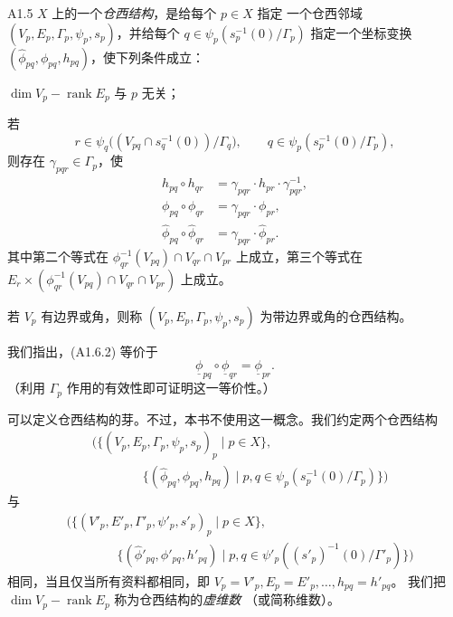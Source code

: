 \begin{definition}{A1.5}\label{def:a1-5}
$X$ 上的一个\emph{仓西结构}，是给每个 $p\in X$ 指定
一个仓西邻域 $(V_p,E_p,\Gamma_p,\psi_p,s_p)$，并给每个
$q\in\psi_p(s_p^{-1}(0)/\Gamma_p)$ 指定一个坐标变换
$(\widehat\phi_{pq},\phi_{pq},h_{pq})$，使下列条件成立：
\begin{description}[style=multiline,leftmargin=7.2em,labelwidth=6.5em]
\item[\textup{(A1.6.1)}] $\dim V_p-\operatorname{rank}E_p$ 与 $p$ 无关；
\item[\textup{(A1.6.2)}] 若
\[
 r\in\psi_q\bigl((V_{pq}\cap s_q^{-1}(0))/\Gamma_q\bigr),
 \qquad q\in\psi_p(s_p^{-1}(0)/\Gamma_p),
\]
则存在 $\gamma_{pqr}\in\Gamma_p$，使
\[
\begin{aligned}
 h_{pq}\circ h_{qr}
 &=\gamma_{pqr}\cdot h_{pr}\cdot\gamma_{pqr}^{-1},\\
 \phi_{pq}\circ\phi_{qr}
 &=\gamma_{pqr}\cdot\phi_{pr},\\
 \widehat\phi_{pq}\circ\widehat\phi_{qr}
 &=\gamma_{pqr}\cdot\widehat\phi_{pr}.
\end{aligned}
\]
其中第二个等式在
$\phi_{qr}^{-1}(V_{pq})\cap V_{qr}\cap V_{pr}$ 上成立，第三个等式在
$E_r\times(\phi_{qr}^{-1}(V_{pq})\cap V_{qr}\cap V_{pr})$ 上成立。
\end{description}
若 $V_p$ 有边界或角，则称
$(V_p,E_p,\Gamma_p,\psi_p,s_p)$ 为带边界或角的仓西结构。
\end{definition}

我们指出，(A1.6.2) 等价于
\[
 \underline\phi_{pq}\circ\underline\phi_{qr}
 =\underline\phi_{pr}.
\]
（利用 $\Gamma_p$ 作用的有效性即可证明这一等价性。）

可以定义仓西结构的芽。不过，本书不使用这一概念。我们约定两个仓西结构
\[
\begin{split}
 &\bigl(\{(V_p,E_p,\Gamma_p,\psi_p,s_p)_p\mid p\in X\},\\
 &\hspace{4em}\{(\widehat\phi_{pq},\phi_{pq},h_{pq})
   \mid p,q\in\psi_p(s_p^{-1}(0)/\Gamma_p)\}\bigr)
\end{split}
\]
与
\[
\begin{split}
 &\bigl(\{(V'_p,E'_p,\Gamma'_p,\psi'_p,s'_p)_p\mid p\in X\},\\
 &\hspace{4em}\{(\widehat\phi'_{pq},\phi'_{pq},h'_{pq})
   \mid p,q\in\psi'_p((s'_p)^{-1}(0)/\Gamma'_p)\}\bigr)
\end{split}
\]
相同，当且仅当所有资料都相同，即
$V_p=V'_p,E_p=E'_p,\ldots,h_{pq}=h'_{pq}$。
我们把 $\dim V_p-\operatorname{rank}E_p$ 称为仓西结构的\emph{虚维数}
（或简称维数）。

